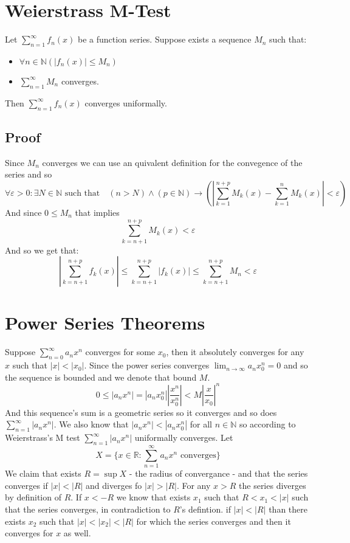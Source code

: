 \documentclass{article}
\newcommand{\N}{\mathbb{N}}
\newcommand{\R}{\mathbb{R}}
\begin{document}
	\newpage
	\section{Weierstrass M-Test}
	Let $\sum_{n=1}^{\infty}{f_n(x)}$ be a function series. 
	Suppose exists a sequence $M_n$ such that:
	\begin{itemize}
    	\item $\forall n\in\N(|f_n(x)| \le M_n)$
    	\item $\sum_{n=1}^{\infty}{M_n}$ converges.
	\end{itemize}
	Then $\sum_{n=1}^\infty f_n(x)$ converges uniformally.
	\subsection{Proof}
		Since $M_n$ converges we can use an quivalent definition for the convegence 
		of the series and so
		\[
			\forall \varepsilon > 0 \colon \exists N\in\N \text{ such that} \quad 
			(n>N) \land (p\in\N) \rightarrow 
			\left(\left|\sum_{k=1}^{n+p}M_k(x) - 
			\sum_{k=1}^{n}M_k(x)\right|<\varepsilon\right)
		\]
	And since $0 \le M_n$ that implies
		\[
			\sum_{k=n+1}^{n+p}M_k(x)<\varepsilon
		\]
	And so we get that:
		\[
			\left|\sum_{k=n+1}^{n+p}{f_k(x)}\right|   \le 
			\sum_{k=n+1}^{n+p}{\left|f_k(x)\right|} \le 
			\sum_{k=n+1}^{n+p}{M_n} < \varepsilon
		\]
		
	\newpage
	
	\section{Power Series Theorems}
	Suppose $\sum_{n=0}^\infty a_nx^n$ converges for some $x_0$, 
	then it absolutely converges for any $x$ such that $|x|<|x_0|$.
	Since the power series converges $\lim_{n\to\infty}{a_nx_0^n}=0$ 
	and so the sequence is bounded 
	and we denote that bound $M$.
	\[
		0 \le |a_nx^n| 
		= |a_nx_0^n|\left|\frac{x^n}{x_0^n}\right| 
		< M\left|\frac{x}{x_0}\right|^n
	\]
	And this sequence's sum is a geometric series so it converges and so does 
	$\sum_{n=1}^\infty|a_nx^n|$. 
	We also know that $|a_nx^n| < |a_nx_0^n|$ for all $n\in\N$ so according to 
	Weierstrass's M test $\sum_{n=1}^\infty|a_nx^n|$ uniformally converges. 
	Let
	\[
		X = \{x\in\R \colon \sum_{n=1}^\infty{a_nx^n}\text{ converges}\}
	\]
	We claim that exists $R = \sup X$ - the radius of convergance - 
	and that the series converges if $|x|<|R|$ and diverges fo $|x|>|R|$. 
	For any $x>R$ the series diverges by definition of $R$. 
	If $x < -R$ we know that exists $x_1$ such that $R < x_1 < |x|$ such that 
	the series converges, in contradiction to $R$'s defintion. 
	if $|x|<|R|$ than there exists $x_2$ such that $|x|<|x_2|<|R|$ 
	for which the series converges and then it converges for $x$ as well.
	
\end{document}
